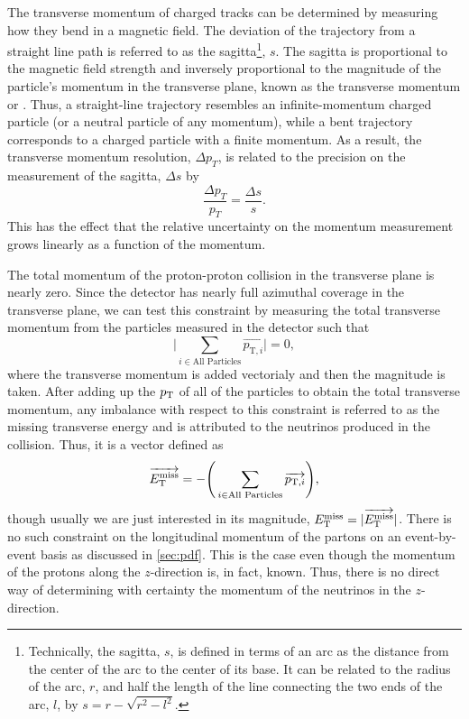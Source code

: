 The transverse momentum of charged tracks can be determined by measuring how they 
bend in a magnetic field. The deviation of the trajectory
from a straight line path is referred to as the 
sagitta\footnote{Technically, the sagitta, $s$, is defined in terms
of an arc as the distance from the center of the arc to the center of its
base. It can be related to the radius of the arc, $r$, and half the length
of the line connecting the two ends of the arc, $l$, by 
$s=r-\sqrt{r^2-l^2}$.}, $s$. The sagitta is proportional to the magnetic
field strength and inversely proportional to the magnitude
of the particle's momentum in the transverse plane, known
as the transverse momentum or \pt.
Thus, a straight-line trajectory resembles an infinite-momentum charged
particle (or a neutral particle of any momentum), while
a bent trajectory corresponds to a charged particle with a finite momentum.
As a result, the transverse momentum resolution, $\Delta p_T$, is related to the 
precision on the measurement of the sagitta, $\Delta s$ by
\begin{equation}
\frac{\Delta p_T }{p_T} = \frac{\Delta s}{s} .
\label{eq:sagitta}
\end{equation}
This has the effect that the relative uncertainty on the momentum
measurement grows linearly as a function of the momentum.


The total momentum of the proton-proton collision in the transverse
plane is nearly zero. Since the detector has nearly full azimuthal coverage 
in the transverse plane, we can test this constraint by measuring
the total transverse momentum from the particles measured in the detector
such that
\begin{equation}
\Bigg| \sum_{i\in\textrm{All Particles}} \overrightarrow{p_{\textrm{T},i}} \Bigg| = 0,
\end{equation}
where the transverse momentum is added vectorialy and then
the magnitude is taken.
After adding up the $p_{\mathrm{T}}$ of all of the particles to obtain
the total transverse momentum, 
any imbalance with respect to this constraint
is referred to as the
missing transverse energy
and is attributed to the 
neutrinos produced in the collision.
Thus, it is a vector defined as
\begin{equation}
\overrightarrow{E_{\mathrm{T}}^{\mathrm{miss}}} = -\Bigg( \sum_{i\in\textrm{All Particles}} \overrightarrow{p_{\textrm{T},i}} \Bigg),
\label{eq:met}
\end{equation}
though usually we are just 
interested in its magnitude, $E_{\mathrm{T}}^{\mathrm{miss}} = |\overrightarrow{E_{\mathrm{T}}^{\mathrm{miss}}}|$.
There is no such constraint on the longitudinal momentum of the partons
on an event-by-event basis
as discussed in \sec\ref{sec:pdf}.
This is the case
even though the momentum of the protons along the $z$-direction
is, in fact, known.
Thus, there is no direct way of determining with certainty the 
momentum of the neutrinos in the $z$-direction.



